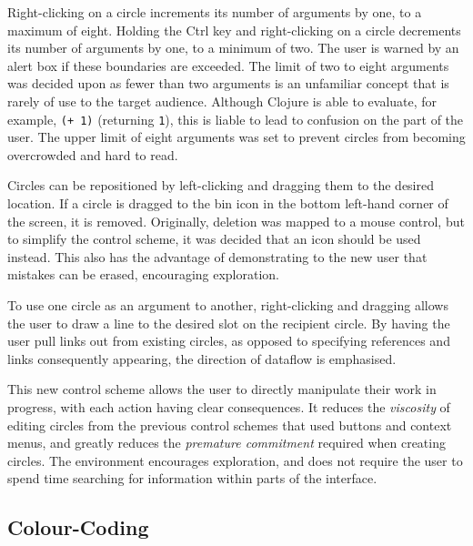 \documentclass[12pt,twoside,notitlepage,xetex]{report}
\begin{document}
Right-clicking on a circle increments its number of arguments by one, to a maximum of eight.  Holding the Ctrl key and right-clicking on a circle decrements its number of arguments by one, to a minimum of two.  The user is warned by an alert box if these boundaries are exceeded.  The limit of two to eight arguments was decided upon as fewer than two arguments is an unfamiliar concept that is rarely of use to the target audience.  Although Clojure is able to evaluate, for example, \verb¬(+ 1)¬ (returning \verb¬1¬), this is liable to lead to confusion on the part of the user.  The upper limit of eight arguments was set to prevent circles from becoming overcrowded and hard to read.

Circles can be repositioned by left-clicking and dragging them to the desired location.  If a circle is dragged to the bin icon in the bottom left-hand corner of the screen, it is removed.  Originally, deletion was mapped to a mouse control, but to simplify the control scheme, it was decided that an icon should be used instead.  This also has the advantage of demonstrating to the new user that mistakes can be erased, encouraging exploration.

To use one circle as an argument to another, right-clicking and dragging allows the user to draw a line to the desired slot on the recipient circle.  By having the user pull links out from existing circles, as opposed to specifying references and links consequently appearing, the direction of dataflow is emphasised.

This new control scheme allows the user to directly manipulate their work in progress, with each action having clear consequences.  It reduces the \emph{viscosity} of editing circles from the previous control schemes that used buttons and context menus, and greatly reduces the \emph{premature commitment} required when creating circles.  The environment encourages exploration, and does not require the user to spend time searching for information within parts of the interface.

\subsection{Colour-Coding}
\end{document}
